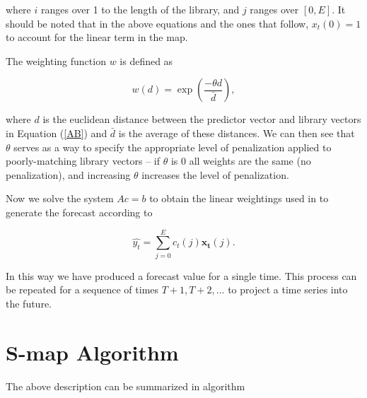 \documentclass[12pt]{article}
\begin{document}
    where $i$ ranges over 1 to the length of the library, and $j$ ranges over $[0,E]$. It should be noted that in the above equations and the ones that follow, $x_t(0) = 1$ to account for the linear term in the map.

	The weighting function $w$ is defined as

	\begin{equation}
		w(d) = \exp \left( \frac{-\theta d}{\bar{d}} \right) ,
	\end{equation}

	where $d$ is the euclidean distance between the predictor vector and library vectors in Equation (\ref{AB}) and $\bar{d}$ is the average of these distances. We can then see that $\theta$ serves as a way to specify the appropriate level of penalization applied to poorly-matching library vectors -- if $\theta$ is 0 all weights are the same (no penalization), and increasing $\theta$ increases the level of penalization.

	Now we solve the system $Ac = b$ to obtain the linear weightings used in to generate the forecast according to

	\begin{equation}
		\hat{y_t} = \sum_{j = 0}^{E} c_t(j) \mathbf{x_t}(j) .
	\end{equation}

	In this way we have produced a forecast value for a single time. This process can be repeated for a sequence of times $T + 1, T + 2, ...$ to project a time series into the future.


\section{S-map Algorithm}

    The above description can be summarized in algorithm
\end{document}
